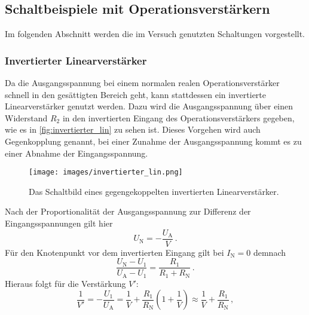     \subsection{Schaltbeispiele mit Operationsverstärkern}

        \noindent 
        Im folgenden Abschnitt werden die im Versuch genutzten Schaltungen vorgestellt. 

        \subsubsection{Invertierter Linearverstärker}

            \noindent 
            Da die Ausgangsspannung bei einem normalen realen Operationsverstärker schnell in den gesättigten Bereich geht, kann stattdessen ein invertierte Linearverstärker 
            genutzt werden. 
            Dazu wird die Ausgangsspannung über einen Widerstand $R_2$ in den invertierten Eingang des Operationsverstärkers gegeben, wie es in \autoref{fig:invertierter_lin}
            zu sehen ist.
            Dieses Vorgehen wird auch Gegenkopplung genannt, bei einer Zunahme der Ausgangsspannung kommt es zu einer Abnahme der Eingangsspannung. 
            \begin{figure}[H]%
                \centering%
                \texttt{[image: images/invertierter\_lin.png]}%
                \caption{Das Schaltbild eines gegengekoppelten invertierten Linearverstärker. \cite{V51}}%
                \label{fig:invertierter_lin}%
            \end{figure}%
            Nach der Proportionalität der Ausgangsspannung zur Differenz der Eingangsspannungen gilt hier 
            \begin{equation}
                U_\text{N} = - \frac{U_\text{A}}{V}\, .
            \end{equation}
            Für den Knotenpunkt vor dem invertierten Eingang gilt bei $I_\text{N} = 0$ demnach 
            \begin{equation*}
                \frac{U_\text{N} - U_1}{U_\text{A} - U_1} = \frac{R_1}{R_1 + R_\text{N}}\, .
            \end{equation*}
            Hieraus folgt für die Verstärkung $V'$: 
            \begin{equation*}
                \frac{1}{V'} = - \frac{U_1}{U_\text{A}} = \frac{1}{V} + \frac{R_1}{R_\text{N}}\left(1 + \frac{1}{V}\right) \approx \frac{1}{V} + \frac{R_1}{R_\text{N}}\, ,
            \end{equation*}
